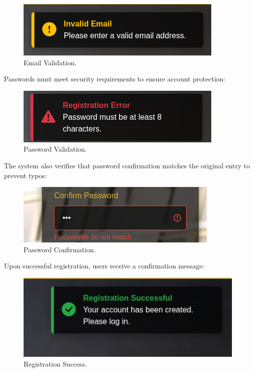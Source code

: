 \begin{figure}[H]
    \centering
    \includegraphics[width=0.6\linewidth]{Figures/images/new_images/ErrorEmail.png}
    \caption{Email Validation.} %
    \label{fig:error-email-wireframe}
\end{figure}

Passwords must meet security requirements to ensure account protection:

\begin{figure}[H]
    \centering
    \includegraphics[width=0.6\linewidth]{Figures/images/new_images/ErrorPassword.png}
    \caption{Password Validation.} %
    \label{fig:error-password-wireframe}
\end{figure}

The system also verifies that password confirmation matches the original entry to prevent typos:

\begin{figure}[H]
    \centering
    \includegraphics[width=0.6\linewidth]{Figures/images/new_images/ErrorConfirmPassword.png}
    \caption{Password Confirmation.} %
    \label{fig:error-confirm-password-wireframe}
\end{figure}

Upon successful registration, users receive a confirmation message:

\begin{figure}[H]
    \centering
    \includegraphics[width=0.6\linewidth]{Figures/images/new_images/RegistrationSuccess.png}
    \caption{Registration Success.} %
    \label{fig:registration-success-wireframe}
\end{figure}

